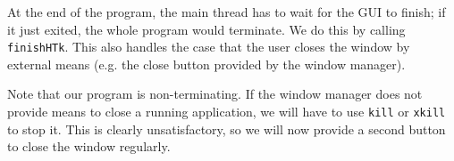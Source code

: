 At the end of the program, the main thread has to wait for the GUI to
finish; if it just exited, the whole program would terminate. We do
this by calling \texttt{finishHTk}. This also handles the case that
the user closes the window by external means (e.g. the close button
provided by the window manager).

Note that our program is non-terminating. If the window manager does
not provide means to close a running application, we will have to use
\texttt{kill} or \texttt{xkill} to stop it. This is clearly
unsatisfactory, so we will now provide a second button to close the
window regularly. 

